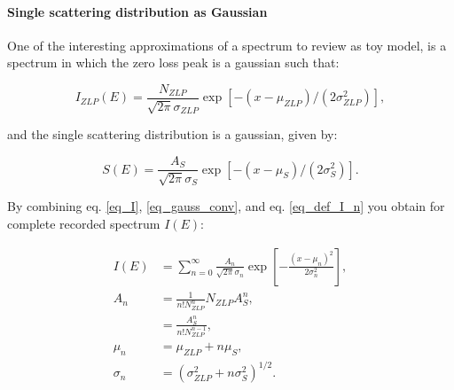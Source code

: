\paragraph{Single scattering distribution as Gaussian}
One of the interesting approximations of a spectrum to review as toy model, is a spectrum in which the zero loss peak is a gaussian such that:

\begin{equation}\label{eq_ZLP_gauss}
I_{ZLP}(E) = \frac{N_{ZLP}}{\sqrt{2\pi}\sigma_{ZLP}} \exp{[-(x-\mu_{ZLP})/(2\sigma_{ZLP}^2)]},
\end{equation}

and the single scattering distribution is a gaussian, given by:

\begin{equation}\label{eq_S_gauss_conv}
S(E) = \frac{A_{S}}{\sqrt{2\pi}\sigma_{S}}  \exp{[-(x-\mu_{S})/(2\sigma_{S}^2)]}.
\end{equation}


By combining eq. \eqref{eq_I}, \eqref{eq_gauss_conv}, and eq. \eqref{eq_def_I_n} you obtain for complete recorded spectrum $I(E)$:

\begin{equation}\label{eq_I_gauss_conv}
\begin{aligned}
I(E) &= \sum_{n=0}^{\infty}  \frac{A_{n}}{\sqrt{2\pi}\sigma_n} \exp{\left[-\frac{(x-\mu_{n})^2}{2\sigma_{n}^2}\right]},\\
A_{n} &= \frac{1}{n! N_{ZLP}^n}N_{ZLP} A_S^n, \\
&= \frac{A_S^n}{n!N_{ZLP}^{n-1}}, \\
\mu_{n} &= \mu_{ZLP} + n \mu_S,\\
\sigma_{n} &= (\sigma_{ZLP}^2 + n \sigma_S^2)^{1/2}.
\end{aligned}
\end{equation}





